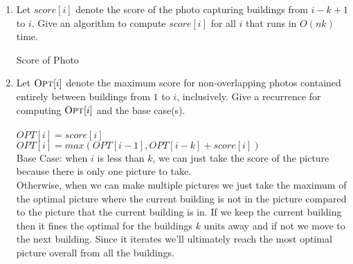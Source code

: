 \documentclass[11pt]{article}
\theoremstyle{definition}
\theoremstyle{theorem}
\newcommand{\opt}{\mbox{{\sc Opt}}}
\begin{document}
\begin{enumerate}[label={\bf (\alph*)}]
	\item Let $score[i]$ denote the score of the photo capturing buildings from $i-k+1$ to $i$. Give an algorithm to compute $score[i]$ for all $i$ that runs in $O(nk)$ time.\\
\begin{algorithm}[H]
\caption{Score of Photo}
\end{algorithm}
	
	
	\item Let $\opt[i]$ denote the maximum score for non-overlapping photos contained entirely between buildings from $1$ to $i$, inclusively. Give a recurrence for computing $\opt[i]$ and the base case(s). \\\\
 $OPT[i] = score[i]$ \\
 $OPT[i] = max(OPT[i - 1], OPT[i - k] + score[i])$ \\
 Base Case: when $i$ is less than $k$, we can just take the score of the picture because there is only one picture to take. \\
 Otherwise, when we can make multiple pictures we just take the maximum of the optimal picture where the current building is not in the picture compared to the picture that the current building is in. If we keep the current building then it fines the optimal for the buildings $k$ units away and if not we move to the next building. Since it iterates we'll ultimately reach the most optimal picture overall from all the buildings.


\end{enumerate}
\end{document}

